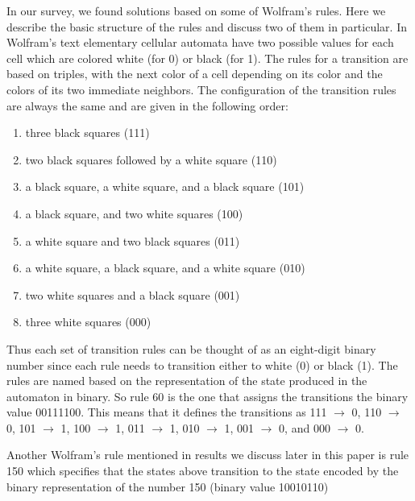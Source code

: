 \documentclass{article}
\begin{document}
In our survey, we found solutions based on some of Wolfram's rules. Here we describe the basic structure of the rules and discuss two of them in particular. In Wolfram's text elementary cellular automata have two possible values for each cell which are colored white (for 0) or black (for 1). The rules for a transition are based on triples, with the next color of a cell depending on its color and the colors of its two immediate neighbors. The configuration of the transition rules are always the same and are given in the following order:
\begin{enumerate}
\item three black squares (111)
\item two black squares followed by a white square (110)
\item a black square, a white square, and a black square (101)
\item a black square, and two white squares (100)
\item a white square and two black squares (011)
\item a white square, a black square, and a white square (010)
\item two white squares and a black square (001)
\item three white squares (000)
\end{enumerate}

Thus each set of transition rules can be thought of as an eight-digit binary number since each rule needs to transition either to white (0) or black (1). 
The rules are named based on the representation of the state produced in the automaton in binary. So rule 60 is the one that assigns the transitions the binary value 00111100. This means that it defines the transitions as 111 $\rightarrow$ 0, 110 $\rightarrow$ 0, 101 $\rightarrow$ 1, 100 $\rightarrow$ 1, 011 $\rightarrow$ 1, 010 $\rightarrow$ 1, 001 $\rightarrow$ 0, and 000 $\rightarrow$ 0.  

Another Wolfram's rule mentioned in results we discuss later in this paper is rule 150 which specifies that the states above transition to the state encoded by the binary representation of the number 150 (binary value 10010110)
\end{document}
